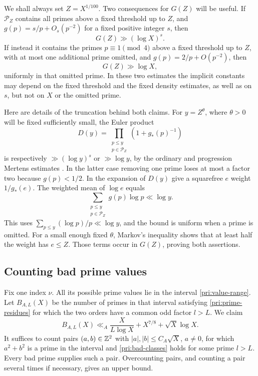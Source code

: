 We shall always set $Z=X^{1/100}$.  Two consequences for $G(Z)$ will
be useful.  If $\mathcal P_Z$ contains all primes above a fixed
threshold up to $Z$, and
$g(p)=s/p+O_s(p^{-2})$ for a fixed positive integer $s$, then
\begin{equation}\label{pri:sieve-dimension}
                              G(Z)\gg(\log X)^s.
\end{equation}
If instead it contains the primes $p\equiv1\pmod4$ above a fixed
threshold up to $Z$, with at most one additional prime omitted, and
$g(p)=2/p+O(p^{-2})$, then
\begin{equation}\label{pri:split-sieve-dimension}
                              G(Z)\gg\log X,
\end{equation}
uniformly in that omitted prime.  In these two estimates the implicit
constants may depend on the fixed threshold and the fixed density
estimates, as well as on $s$, but not on $X$ or the omitted prime.

Here are details of the truncation behind both claims.  For
$y=Z^\theta$, where $\theta>0$ will be fixed sufficiently small, the
Euler product
\[
             D(y)=\prod_{\substack{p\le y\\p\in\mathcal P_Z}}
                               (1+g_*(p)^{-1})
\]
is respectively $\gg(\log y)^s$ or $\gg\log y$, by the ordinary and
progression Mertens estimates
\cite[equation~(1.1) and Theorem~1]{Williams1974}.  In the latter case removing one prime
loses at most a factor two because $g(p)<1/2$.
In the expansion of $D(y)$ give a squarefree $e$ weight $1/g_*(e)$.
The weighted mean of $\log e$ equals
\[
                          \sum_{\substack{p\le y\\p\in\mathcal P_Z}}
                                 g(p)\log p\ll\log y.
\]
This uses $\sum_{p\le y}(\log p)/p\ll\log y$, and the bound is uniform
when a prime is omitted.  For a small enough fixed $\theta$, Markov's
inequality shows that at least half the weight has $e\le Z$.
Those terms occur in $G(Z)$, proving both assertions.

\subsection{Counting bad prime values}

Fix one index $\nu$.  All its possible prime values lie in the interval
\eqref{pri:value-range}.  Let $B_{A,L}(X)$ be the number of primes in
that interval satisfying \eqref{pri:prime-residues} for which the two
orders have a common odd factor $l>L$.  We claim
\begin{equation}\label{pri:bad-primes}
            B_{A,L}(X)\ll_A
             \frac{X}{L\log X}+X^{7/8}+\sqrt X\log X.
\end{equation}
It suffices to count pairs $(a,b)\in\mathbb Z^2$ with
$|a|,|b|\le C_A\sqrt X$, $a\ne0$, for which $a^2+b^2$ is a prime
in the interval and \eqref{pri:bad-classes} holds for some prime
$l>L$.  Every bad prime supplies such a pair.  Overcounting pairs, and
counting a pair several times if necessary, gives an upper bound.

